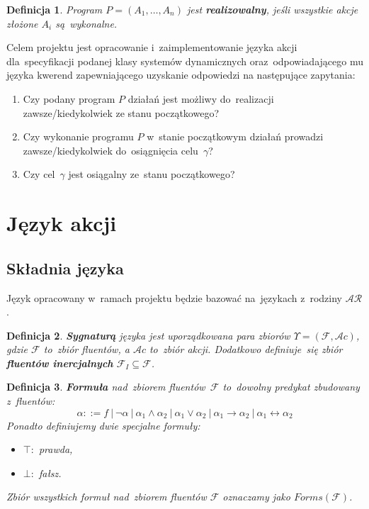 \documentclass[11pt,a4paper]{article}
\newtheorem{defn}{Definicja}
\begin{document}
\begin{defn}
    Program $P = (A_1, \dots, A_n)$ jest \textbf{realizowalny}, jeśli wszystkie akcje złożone $A_i$ są~wykonalne.
\end{defn}

Celem projektu jest opracowanie i~zaimplementowanie języka akcji dla~specyfikacji podanej klasy systemów dynamicznych oraz~odpowiadającego mu języka kwerend zapewniającego uzyskanie odpowiedzi na następujące zapytania:

\begin{enumerate}
    \item Czy podany program $P$ działań jest możliwy do~realizacji zawsze/kiedykolwiek ze stanu początkowego?
    \item Czy wykonanie programu $P$ w~stanie początkowym działań prowadzi zawsze/kiedykolwiek do~osiągnięcia celu~$\gamma$?
    \item Czy cel~$\gamma$ jest osiągalny ze~stanu początkowego?
\end{enumerate}

\section{Język akcji}

\subsection{Składnia języka}

Język opracowany w~ramach projektu będzie bazować na~językach z~rodziny $\mathcal{AR}$.

\begin{defn}
    \textbf{Sygnaturą} języka jest uporządkowana para zbiorów $\Upsilon = (\mathcal{F}, \mathcal{A}c)$, gdzie $\mathcal{F}$ to~zbiór fluentów, a $ \mathcal{A}c$ to~zbiór akcji. Dodatkowo definiuje~się zbiór \textbf{fluentów inercjalnych} $\mathcal{F}_I \subseteq \mathcal{F}$.
\end{defn}

\begin{defn}
    \textbf{Formuła} nad~zbiorem fluentów~$\mathcal{F}$ to~dowolny predykat zbudowany z~fluentów: 
    $$ \alpha ::= f\ |\ \neg\alpha\ |\ \alpha_1 \land \alpha_2\ |\ \alpha_1 \lor \alpha_2\ |\ \alpha_1 \rightarrow \alpha_2\ |\ \alpha_1 \leftrightarrow \alpha_2 $$
    Ponadto definiujemy dwie specjalne formuły:
    
    \begin{itemize}
    \item $\top\colon$ prawda,
    
    \item $\bot\colon$ fałsz.
    \end{itemize}
    
    Zbiór wszystkich formuł nad~zbiorem fluentów $\mathcal{F}$ oznaczamy jako $Forms(\mathcal{F})$.
\end{defn}
\end{document}
